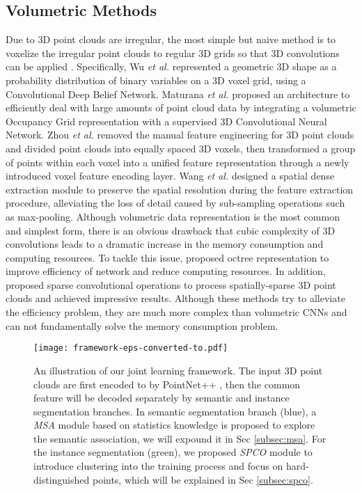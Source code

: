 \documentclass{cta-author}
\begin{document}
\subsection{Volumetric Methods}
Due to 3D point clouds are irregular, the most simple but naive method is to voxelize the irregular point clouds to regular 3D grids so that 3D convolutions can be applied \cite{wu20153d,wang2019voxsegnet,graham20183d,wang2017cnn,zhou2018voxelnet,qi2016volumetric,klokov2017escape,riegler2017octnet,lei2019octree,ren2018sbnet,maturana2015voxnet,huang2016point}. Specifically, Wu \emph{et al.} \cite{wu20153d} represented a geometric 3D shape as a probability distribution of binary variables on a 3D voxel grid, using a Convolutional Deep Belief Network. Maturana \emph{et al.} \cite{maturana2015voxnet} proposed an architecture to efficiently deal with large amounts of point cloud data by integrating a volumetric Occupancy Grid representation with a supervised 3D Convolutional Neural Network. Zhou \emph{et al.} \cite{zhou2018voxelnet} removed the manual feature engineering for 3D point clouds and divided point clouds into equally spaced 3D voxels, then transformed a group of points within each voxel into a unified feature representation through a newly introduced voxel feature encoding layer. Wang \emph{et al.} \cite{wang2019voxsegnet} designed a spatial dense extraction module to preserve the spatial resolution during the feature extraction procedure, alleviating the loss of detail caused by sub-sampling operations such as max-pooling.
Although volumetric data representation is the most common and simplest form, there is an obvious drawback that cubic complexity of 3D convolutions leads to a dramatic increase in the memory consumption and computing resources. To tackle this issue, \cite{wang2017cnn,riegler2017octnet} proposed octree representation to improve efficiency of network and reduce computing resources. In addition, \cite{graham20183d,ren2018sbnet} proposed sparse convolutional operations to process spatially-sparse 3D point clouds and achieved impressive results. Although these methods try to alleviate the efficiency problem, they are much more complex than volumetric CNNs and can not fundamentally solve the memory consumption problem.
\begin{figure}[t]
    \begin{center}
     \texttt{[image: framework-eps-converted-to.pdf]}
    \end{center}
    \caption{An illustration of our joint learning framework. The input 3D point clouds are first encoded to  by PointNet++ \cite{qi2017pointnet++}, then the common feature will be decoded separately by semantic and instance segmentation branches. In semantic segmentation branch (blue), a \textit{MSA} module based on statistics knowledge is proposed to explore the semantic association, we will expound it in Sec \ref{subsec:msa}. For the instance segmentation (green), we proposed \textit{SPCO} module to introduce clustering into the training process and focus on hard-distinguished points, which will be explained in  Sec \ref{subsec:spco}.}
    \label{fig1}
\end{figure}
\end{document}
